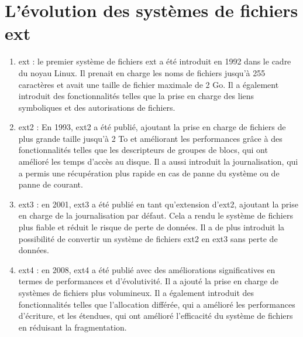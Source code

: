 \documentclass[12pt, letterpaper]{report}
\begin{document}
\section{L'évolution des systèmes de fichiers ext}
\begin{enumerate}
  \item ext : le premier système de fichiers ext a été introduit en 1992 dans le cadre du noyau Linux. Il prenait en charge les noms de fichiers jusqu'à 255 caractères et avait une taille de fichier maximale de 2 Go. Il a également introduit des fonctionnalités telles que la prise en charge des liens symboliques et des autorisations de fichiers.
  \item ext2 : En 1993, ext2 a été publié, ajoutant la prise en charge de fichiers de plus grande taille jusqu'à 2 To et améliorant les performances grâce à des fonctionnalités telles que les descripteurs de groupes de blocs, qui ont amélioré les temps d'accès au disque. Il a aussi introduit la journalisation, qui a permis une récupération plus rapide en cas de panne du système ou de panne de courant.
  \item ext3 : en 2001, ext3 a été publié en tant qu'extension d'ext2, ajoutant la prise en charge de la journalisation par défaut. Cela a rendu le système de fichiers plus fiable et réduit le risque de perte de données. Il a de plus introduit la possibilité de convertir un système de fichiers ext2 en ext3 sans perte de données.
  \item 	ext4 : en 2008, ext4 a été publié avec des améliorations significatives en termes de performances et d'évolutivité. Il a ajouté la prise en charge de systèmes de fichiers plus volumineux. Il a également introduit des fonctionnalités telles que l'allocation différée, qui a amélioré les performances d'écriture, et les étendues, qui ont amélioré l'efficacité du système de fichiers en réduisant la fragmentation.
\end{enumerate}
\end{document}
